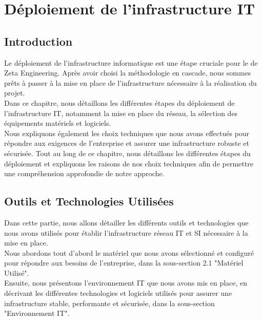 \chapter{Déploiement de l'infrastructure IT}



\section{Introduction}

Le déploiement de l'infrastructure informatique est une étape cruciale pour le de Zeta Engineering. Après avoir choisi la méthodologie en cascade, nous sommes prêts à passer à la mise en place de l'infrastructure nécessaire à la réalisation du projet. \\

Dans ce chapitre, nous détaillons les différentes étapes du déploiement de l'infrastructure IT, notamment la mise en place du réseau, la sélection des équipements matériels et logiciels. \\

Nous expliquons également les choix techniques que nous avons effectués pour répondre aux exigences de l'entreprise et assurer une infrastructure robuste et sécurisée. Tout au long de ce chapitre, nous détaillons les différentes étapes du déploiement et expliquons les raisons de nos choix techniques afin de permettre une compréhension approfondie de notre approche. \\




\section{Outils et Technologies Utilisées}

Dans cette partie, nous allons détailler les différents outils et technologies que nous avons utilisés pour établir l'infrastructure réseau IT et SI nécessaire à la mise en place.\\

Nous abordons tout d'abord le matériel que nous avons sélectionné et configuré pour répondre aux besoins de l'entreprise, dans la sous-section 2.1 "Matériel Utilisé". \\

Ensuite, nous présentons l'environnement IT que nous avons mis en place, en décrivant les différentes technologies et logiciels utilisés pour assurer une infrastructure stable, performante et sécurisée, dans la sous-section "Environnement IT".  \\

